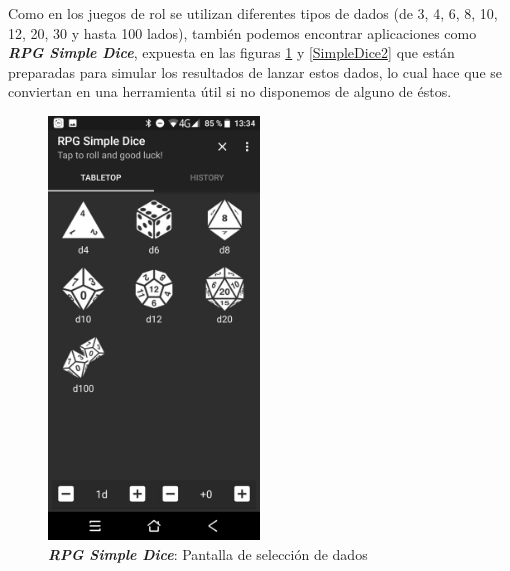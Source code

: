 Como en los juegos de rol se utilizan diferentes tipos de dados 
(de 3, 4, 6, 8, 10, 12, 20, 30 y hasta 100 lados), también podemos encontrar aplicaciones 
como \textit{\textbf{RPG Simple Dice}}, expuesta en las figuras \ref*{SimpleDice1} y \ref*{SimpleDice2} que están preparadas para simular los resultados 
de lanzar estos dados, lo cual hace que se conviertan en una herramienta útil si no 
disponemos de alguno de éstos.

\begin{figure}[H]
    \centering
    \begin{minipage}{0.35\textwidth}
        \centering
        \includegraphics[width=0.5\textwidth]{Images/RPG_Simple_Dice_1.jpeg}
        \caption{\textit{\textbf{RPG Simple Dice}}: Pantalla de selección 
        de dados}
        \label{SimpleDice1}        
    \end{minipage} \hspace{2cm}
    \begin{minipage}{0.35\textwidth}
        \centering

\end{minipage}
\end{figure}
